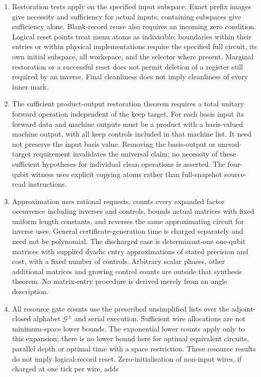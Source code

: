\begin{enumerate}
\item Restoration tests apply on the specified input subspace. Exact prefix images give necessity and sufficiency for actual inputs; containing subspaces give sufficiency alone. Blank-record reuse also requires an incoming zero condition. Logical reset points treat menu atoms as indivisible; boundaries within their entries or within physical implementations require the specified full circuit, its own initial subspace, all workspace, and the selector where present. Marginal restoration or a successful reset does not permit deletion of a register still required by an inverse. Final cleanliness does not imply cleanliness of every inner mark.
\item The sufficient product-output restoration theorem requires a total unitary forward operation independent of the keep target. For each basis input its forward data and machine outputs must be a product with a basis-valued machine output, with all keep controls included in that machine list. It need not preserve the input basis value. Removing the basis-output or unread-target requirement invalidates the universal claim; no necessity of these sufficient hypotheses for individual clean operations is asserted. The four-qubit witness uses explicit copying atoms rather than full-snapshot source-read instructions.
\item Approximation uses rational requests, counts every expanded factor occurrence including inverses and controls, bounds actual matrices with fixed uniform length constants, and reverses the same approximating circuit for inverse uses. General certificate-generation time is charged separately and need not be polynomial. The discharged case is determinant-one one-qubit matrices with supplied dyadic entry approximations of stated precision and cost, with a fixed number of controls. Arbitrary scalar phases, other additional matrices and growing control counts are outside that synthesis theorem. No matrix-entry procedure is derived merely from an angle description.
\item All resource gate counts use the prescribed unsimplified lists over the adjoint-closed alphabet $\mathcal G^{\pm}$ and serial execution. Sufficient wire allocations are not minimum-space lower bounds. The exponential lower counts apply only to this expansion; there is no lower bound here for optimal equivalent circuits, parallel depth or optimal time with a space restriction. These resource results do not imply logical-record reset. Zero-initialisation
of non-input wires, if charged at one tick per wire, adds

\end{enumerate}
